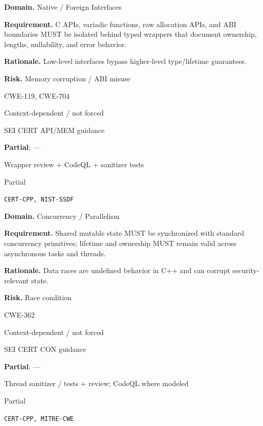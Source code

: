 \documentclass[10pt,letterpaper]{article}
\newcommand{\prioritybadge}[2]{\tcbox[on line,boxrule=0pt,arc=1.2mm,boxsep=0.7mm,left=1mm,right=1mm,top=0.4mm,bottom=0.4mm,colback=#2!12,coltext=#2]{\scriptsize\bfseries #1}}
\begin{document}
\begin{rulebox}[title={\texttt{SCS-CPP-FFI-001} \hfill \prioritybadge{Critical Control}{Critical}}]
\textbf{Domain.} Native / Foreign Interfaces

\textbf{Requirement.} C APIs, variadic functions, raw allocation APIs, and ABI boundaries MUST be isolated behind typed wrappers that document ownership, lengths, nullability, and error behavior.

\textbf{Rationale.} Low-level interfaces bypass higher-level type/lifetime guarantees.

\textbf{Risk.} Memory corruption / ABI misuse

\begin{description}[leftmargin=2.65cm,labelwidth=2.3cm,style=nextline,itemsep=1pt,topsep=3pt]
  \item[CWE] CWE-119, CWE-704
  \item[OWASP] Context-dependent / not forced
  \item[CERT] SEI CERT API/MEM guidance
  \item[CodeQL] \textbf{Partial}; ---
  \item[Enforcement] Wrapper review + CodeQL + sanitizer tests
  \item[Automation] Partial
  \item[Sources] \texttt{CERT-CPP, NIST-SSDF}
\end{description}
\end{rulebox}

\begin{rulebox}[title={\texttt{SCS-CPP-CONC-001} \hfill \prioritybadge{High Priority}{High}}]
\textbf{Domain.} Concurrency / Parallelism

\textbf{Requirement.} Shared mutable state MUST be synchronized with standard concurrency primitives; lifetime and ownership MUST remain valid across asynchronous tasks and threads.

\textbf{Rationale.} Data races are undefined behavior in C++ and can corrupt security-relevant state.

\textbf{Risk.} Race condition

\begin{description}[leftmargin=2.65cm,labelwidth=2.3cm,style=nextline,itemsep=1pt,topsep=3pt]
  \item[CWE] CWE-362
  \item[OWASP] Context-dependent / not forced
  \item[CERT] SEI CERT CON guidance
  \item[CodeQL] \textbf{Partial}; ---
  \item[Enforcement] Thread sanitizer / tests + review; CodeQL where modeled
  \item[Automation] Partial
  \item[Sources] \texttt{CERT-CPP, MITRE-CWE}
\end{description}
\end{rulebox}
\end{document}
